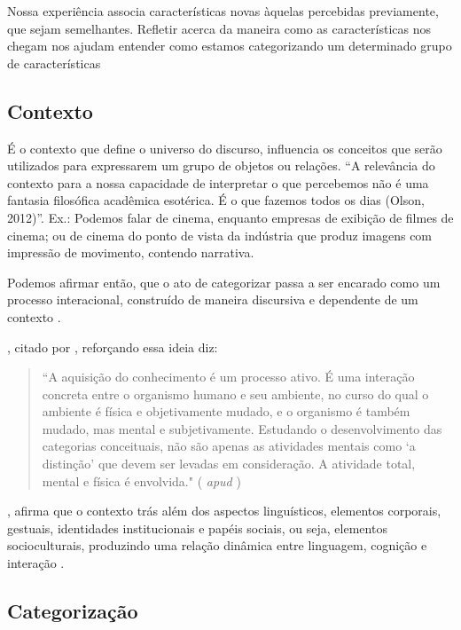 Nossa experiência associa características novas àquelas percebidas previamente, que sejam semelhantes. Refletir acerca da maneira como as características nos chegam nos ajudam entender como estamos categorizando um determinado grupo de características

\subsection{\hspace*{3pt} Contexto}

É o contexto que define o universo do discurso, influencia os conceitos que serão utilizados para expressarem um grupo de objetos ou relações. ``A relevância do contexto para a nossa capacidade de interpretar o que percebemos não é uma fantasia filosófica acadêmica esotérica. É o que fazemos todos os dias (Olson, 2012)''. Ex.: Podemos falar de cinema, enquanto empresas de exibição de filmes de cinema; ou de cinema do ponto de vista da indústria que produz imagens com impressão de movimento, contendo narrativa.

Podemos afirmar então, que o ato de categorizar passa a ser encarado como um processo interacional, construído de maneira discursiva e dependente de um contexto \citep{carvalho:2013.categorizacao}.

\citet{vickery:1980.classificacao}, citado por \citet{silva:2011.categorias}, reforçando essa ideia diz: 

\begin{quote}
``A aquisição do conhecimento é um processo ativo. É uma interação concreta entre o organismo humano e seu ambiente, no curso do qual o ambiente é física e objetivamente mudado, e o organismo é também mudado, mas mental e subjetivamente. Estudando o desenvolvimento das categorias conceituais, não são apenas as atividades mentais como ‘a distinção’ que devem ser levadas em consideração. A atividade total, mental e física é envolvida." (\citealp[p.236]{vickery:1980.classificacao} \textit{apud} \citealp{silva:2011.categorias})
\end{quote}

\citet[p.104]{medrado:2008.espelho}, afirma que o contexto trás além dos aspectos linguísticos, elementos corporais, gestuais, identidades institucionais e papéis sociais, ou seja, elementos socioculturais, produzindo uma relação dinâmica entre linguagem, cognição e interação \citep{carvalho:2013.categorizacao}.

\subsection{\hspace*{3pt} Categorização}

